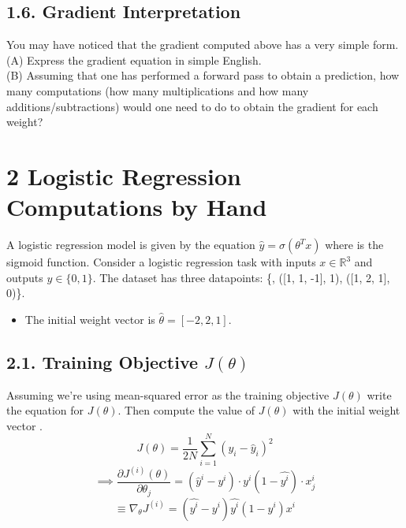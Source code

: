 \documentclass[11pt]{article}
\theoremstyle{plain}
\begin{document}

\subsection*{1.6. Gradient Interpretation }
You may have noticed that the gradient computed above has a very simple form.  \\
(A) Express the gradient equation in simple English.    \\
(B) Assuming that one has performed a forward pass to obtain a prediction, how many computations (how many multiplications and how many additions/subtractions) would one need to do to obtain the gradient for each weight?

\section*{2 Logistic Regression Computations by Hand   }

A logistic regression model is given by the equation $\hat{y}=\sigma(\theta^{T}x)$ where is the sigmoid function.  Consider a logistic regression task with inputs $x\in\mathbb{R}^{3}$ and outputs $y\in\{0,1\}$.  The dataset has three datapoints: \{, ([1, 1, -1], 1), ([1, 2, 1], 0)\}.
\begin{itemize}
	\item The initial weight vector is $\hat{\theta}=[-2,2,1]$.
\end{itemize}

\subsection*{2.1. Training Objective $J(\theta)$ }
Assuming we're using mean-squared error as the training objective $J(\theta)$ write the equation for $J(\theta)$.  Then compute the value of $J(\theta)$ with the initial weight vector .
\[
	J(\theta) = \frac{1}{2N}\sum_{i=1}^{N} (y_i - \hat{y}_i)^2
\]
\[
	\implies \frac{\partial J^{(i)}(\theta)}{\partial \theta_j} = (\hat{y}^i-y^i) \cdot y^i(1-\hat{y^i})\cdot x_j^i
\]
\[
	\equiv \nabla_{\theta}J^{(i)} = (\hat{y^i}-y^i)\hat{y^i}(1-y^i)x^i
\]
\end{document}
